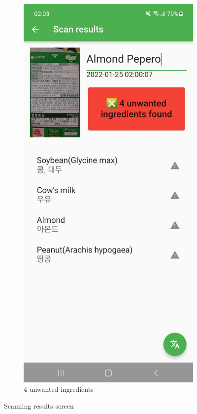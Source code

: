 \begin{figure}[h]
\begin{subfigure}{0.5\textwidth}
        \label{fig:scan-pass}
    \end{subfigure}
    \begin{subfigure}{0.5\textwidth}
        \centering
        \includegraphics[width=0.9\linewidth]{Figures/Screenshot/scan_warn.jpg}
        \caption{4 unwanted ingredients}
        \label{fig:scan-warn}
    \end{subfigure}
    \caption{Scanning results screen}
    \label{fig:scan}
\end{figure}

